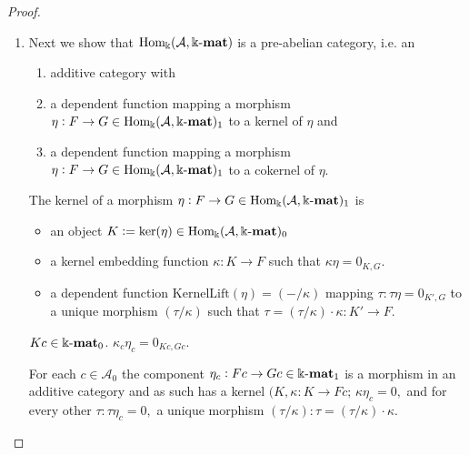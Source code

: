 \begin{proof}
\begin{enumerate}
\item Next we show that $\mathrm{Hom_{\Bbbk}}(\mathcal{A},\Bbbk\textnormal{-}\mathbf{mat})$ is a pre-abelian category, i.e. an
\begin{enumerate}
\renewcommand{\labelenumii}{(\roman{enumii})}
\item additive category with
\item a dependent function mapping a morphism $\eta : F \rightarrow G \in \mathrm{Hom_{\Bbbk}}(\mathcal{A},\Bbbk\textnormal{-}\mathbf{mat})_{1}$ to a kernel of $\eta$ and
\item a dependent function mapping a morphism $\eta : F \rightarrow G \in \mathrm{Hom_{\Bbbk}}(\mathcal{A},\Bbbk\textnormal{-}\mathbf{mat})_{1}$ to a cokernel of $\eta$.
\end{enumerate}
\begin{subproof}[Proof of (ii)]
The kernel of a morphism $\eta : F \rightarrow G \in \mathrm{Hom_{\Bbbk}}(\mathcal{A},\Bbbk\textnormal{-}\mathbf{mat})_{1}$ is
\begin{itemize}
\item an object $K := \mathrm{ker}(\eta) \in \mathrm{Hom_{\Bbbk}}(\mathcal{A},\Bbbk\textnormal{-}\mathbf{mat})_{0}$
\item a kernel embedding function $\kappa : K \rightarrow F$ such that $\kappa \eta = 0_{K,G}$.
\item a dependent function $\mathrm{KernelLift}(\eta) = ( - / \kappa)$ mapping $\tau : \tau\eta = 0_{K',G}$ to a unique morphism
$(\tau / \kappa)$ such that $\tau = (\tau /\kappa )\cdot \kappa : K' \rightarrow F$.
\end{itemize}

$Kc \in \Bbbk\textnormal{-}\mathbf{mat}_{0}$. $\kappa_{c} \eta_{c} = 0_{Kc,Gc}$.


For each $c \in \mathcal{A}_{0}$ the component $\eta_{c} : Fc \rightarrow Gc \in \Bbbk\textnormal{-}\mathbf{mat}_{1}$ is a morphism in an additive category and as such has a
kernel $(K, \kappa : K \rightarrow Fc;\, \kappa \eta_{c} = 0,$ and for every other $\tau : \tau\eta_{c} = 0, $ a unique morphism
$(\tau / \kappa) : \tau = (\tau / \kappa) \cdot \kappa$.


\end{subproof}



\end{enumerate}
\end{proof}




